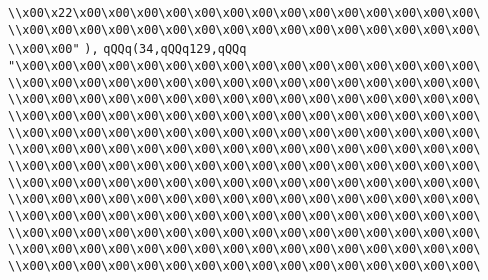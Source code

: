 \verb|\\x00\x22\x00\x00\x00\x00\x00\x00\x00\x00\x00\x00\x00\x00\x00\x00\|\newline
\verb|\\x00\x00\x00\x00\x00\x00\x00\x00\x00\x00\x00\x00\x00\x00\x00\x00\|\newline
\verb|\\x00\x00"|\newline
\verb|),|\newline
\verb|qQQq(34,qQQq129,qQQq|\newline
\verb|"\x00\x00\x00\x00\x00\x00\x00\x00\x00\x00\x00\x00\x00\x00\x00\x00\|\newline
\verb|\\x00\x00\x00\x00\x00\x00\x00\x00\x00\x00\x00\x00\x00\x00\x00\x00\|\newline
\verb|\\x00\x00\x00\x00\x00\x00\x00\x00\x00\x00\x00\x00\x00\x00\x00\x00\|\newline
\verb|\\x00\x00\x00\x00\x00\x00\x00\x00\x00\x00\x00\x00\x00\x00\x00\x00\|\newline
\verb|\\x00\x00\x00\x00\x00\x00\x00\x00\x00\x00\x00\x00\x00\x00\x00\x00\|\newline
\verb|\\x00\x00\x00\x00\x00\x00\x00\x00\x00\x00\x00\x00\x00\x00\x00\x00\|\newline
\verb|\\x00\x00\x00\x00\x00\x00\x00\x00\x00\x00\x00\x00\x00\x00\x00\x00\|\newline
\verb|\\x00\x00\x00\x00\x00\x00\x00\x00\x00\x00\x00\x00\x00\x00\x00\x00\|\newline
\verb|\\x00\x00\x00\x00\x00\x00\x00\x00\x00\x00\x00\x00\x00\x00\x00\x00\|\newline
\verb|\\x00\x00\x00\x00\x00\x00\x00\x00\x00\x00\x00\x00\x00\x00\x00\x00\|\newline
\verb|\\x00\x00\x00\x00\x00\x00\x00\x00\x00\x00\x00\x00\x00\x00\x00\x00\|\newline
\verb|\\x00\x00\x00\x00\x00\x00\x00\x00\x00\x00\x00\x00\x00\x00\x00\x00\|\newline
\verb|\\x00\x00\x00\x00\x00\x00\x00\x00\x00\x00\x00\x00\x00\x00\x00\x00\|\newline
